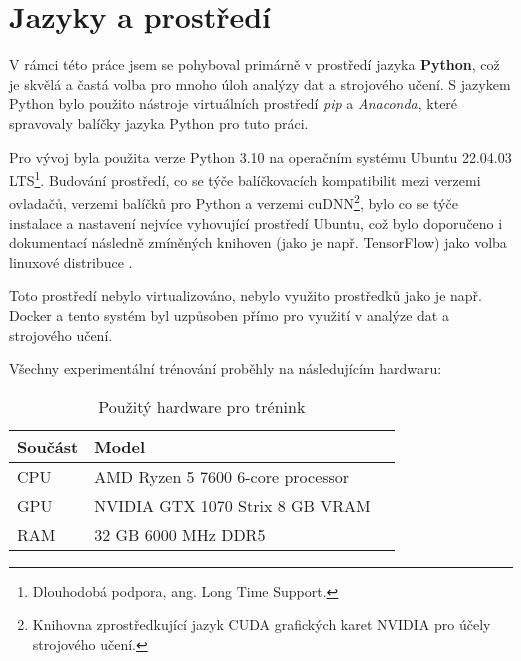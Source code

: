 \section{Jazyky a prostředí}
\label{sec:Chapter51}
V rámci této práce jsem se pohyboval primárně v prostředí jazyka \textbf{Python}, což je skvělá a častá volba pro mnoho úloh analýzy dat a strojového učení. S jazykem Python bylo použito nástroje virtuálních prostředí \textit{pip} a \textit{Anaconda}, které spravovaly balíčky jazyka Python pro tuto práci.

Pro vývoj byla použita verze Python 3.10 na operačním systému Ubuntu 22.04.03 LTS\footnote{Dlouhodobá podpora, ang. Long Time Support.}. Budování prostředí, co se týče balíčkovacích kompatibilit mezi verzemi ovladačů, verzemi balíčků pro Python a verzemi cuDNN\footnote{Knihovna zprostředkující jazyk CUDA grafických karet NVIDIA pro účely strojového učení.}, bylo co se týče instalace a nastavení nejvíce vyhovující prostředí Ubuntu, což bylo doporučeno i dokumentací následně zmíněných knihoven (jako je např. TensorFlow) jako volba linuxové distribuce \cite{tensorflow_install}.

Toto prostředí nebylo virtualizováno, nebylo využito prostředků jako je např. Docker a tento systém byl uzpůsoben přímo pro využití v analýze dat a strojového učení.

Všechny experimentální trénování proběhly na následujícím hardwaru:

\begin{table}[ht]
\centering
\begin{tabular}{@{}lll@{}}
\toprule
Součást & Model \\
\midrule
CPU & AMD Ryzen 5 7600 6-core processor \\
GPU & NVIDIA GTX 1070 Strix 8 GB VRAM  \\
RAM & 32 GB 6000 MHz DDR5 \\
\bottomrule
\end{tabular}
\caption{Použitý hardware pro trénink}
\label{fig:wortelus_pc}
\end{table}

